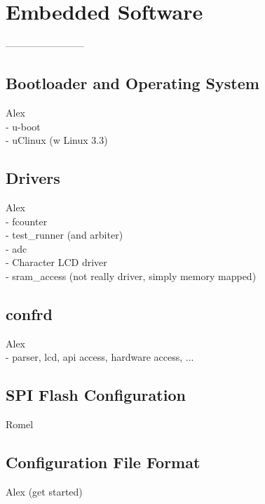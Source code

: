 \chapter{Embedded Software}
------------------------

\section{Bootloader and Operating System}
Alex \\
   - u-boot \\
   - uClinux (w\/ Linux 3.3) \\


\section{Drivers}
Alex \\
   - fcounter \\
   - test\_runner (and arbiter) \\
   - adc \\
   - Character LCD driver \\
   - sram\_access (not really driver, simply memory mapped) \\

\section{confrd}
Alex \\
   - parser, lcd, api access, hardware access, ...



\section{SPI Flash Configuration}
Romel


\section{Configuration File Format}
Alex (get started)